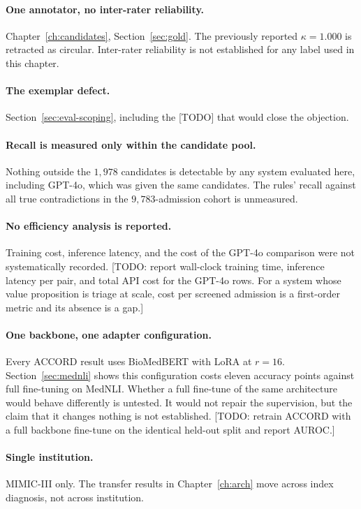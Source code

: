 \paragraph{One annotator, no inter-rater reliability.}
Chapter~\ref{ch:candidates}, Section~\ref{sec:gold}. The previously reported
$\kappa = 1.000$ is retracted as circular. Inter-rater reliability is not
established for any label used in this chapter.

\paragraph{The exemplar defect.} Section~\ref{sec:eval-scoping}, including the
[TODO] that would close the objection.

\paragraph{Recall is measured only within the candidate pool.} Nothing outside
the $1{,}978$ candidates is detectable by any system evaluated here, including
GPT-4o, which was given the same candidates. The rules' recall against all true
contradictions in the $9{,}783$-admission cohort is unmeasured.

\paragraph{No efficiency analysis is reported.} Training cost, inference
latency, and the cost of the GPT-4o comparison were not systematically recorded.
[TODO: report wall-clock training time, inference latency per pair, and total
API cost for the GPT-4o rows. For a system whose value proposition is triage at
scale, cost per screened admission is a first-order metric and its absence is a
gap.]

\paragraph{One backbone, one adapter configuration.} Every ACCORD result uses
BioMedBERT with LoRA at $r = 16$. Section~\ref{sec:mednli} shows this
configuration costs eleven accuracy points against full fine-tuning on MedNLI.
Whether a full fine-tune of the same architecture would behave differently is
untested. It would not repair the supervision, but the claim that it changes
nothing is not established. [TODO: retrain ACCORD with a full backbone
fine-tune on the identical held-out split and report AUROC.]

\paragraph{Single institution.} MIMIC-III only. The transfer results in
Chapter~\ref{ch:arch} move across index diagnosis, not across institution.

